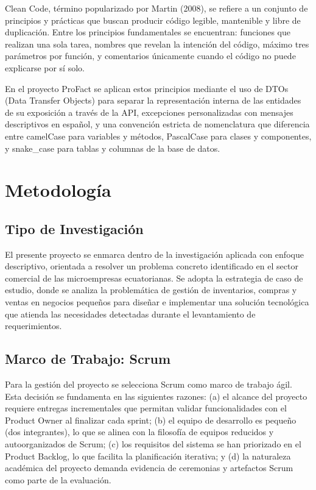 \documentclass[12pt, letterpaper]{report}
\begin{document}
Clean Code, término popularizado por Martin (2008), se refiere a un conjunto de principios y prácticas que buscan producir código legible, mantenible y libre de duplicación. Entre los principios fundamentales se encuentran: funciones que realizan una sola tarea, nombres que revelan la intención del código, máximo tres parámetros por función, y comentarios únicamente cuando el código no puede explicarse por sí solo.

En el proyecto ProFact se aplican estos principios mediante el uso de DTOs (Data Transfer Objects) para separar la representación interna de las entidades de su exposición a través de la API, excepciones personalizadas con mensajes descriptivos en español, y una convención estricta de nomenclatura que diferencia entre camelCase para variables y métodos, PascalCase para clases y componentes, y snake\_case para tablas y columnas de la base de datos.


\chapter{Metodología}

\section{Tipo de Investigación}

El presente proyecto se enmarca dentro de la investigación aplicada con enfoque descriptivo, orientada a resolver un problema concreto identificado en el sector comercial de las microempresas ecuatorianas. Se adopta la estrategia de caso de estudio, donde se analiza la problemática de gestión de inventarios, compras y ventas en negocios pequeños para diseñar e implementar una solución tecnológica que atienda las necesidades detectadas durante el levantamiento de requerimientos.

\section{Marco de Trabajo: Scrum}

Para la gestión del proyecto se selecciona Scrum como marco de trabajo ágil. Esta decisión se fundamenta en las siguientes razones: (a) el alcance del proyecto requiere entregas incrementales que permitan validar funcionalidades con el Product Owner al finalizar cada sprint; (b) el equipo de desarrollo es pequeño (dos integrantes), lo que se alinea con la filosofía de equipos reducidos y autoorganizados de Scrum; (c) los requisitos del sistema se han priorizado en el Product Backlog, lo que facilita la planificación iterativa; y (d) la naturaleza académica del proyecto demanda evidencia de ceremonias y artefactos Scrum como parte de la evaluación.
\end{document}
